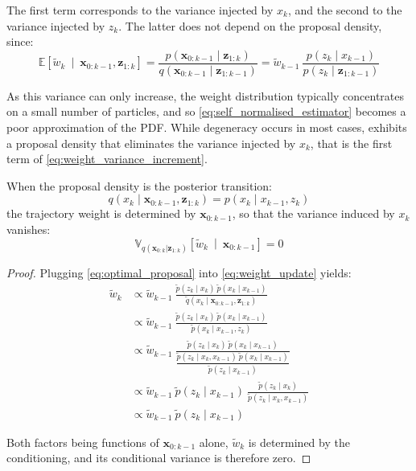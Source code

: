 The first term corresponds to the variance injected by $x_k$, and the second to the variance injected by $z_k$. The latter does not depend on the proposal density, since:
\begin{equation}
	\mathbb{E}\left[\tilde{w}_k\:\middle|\:\mathbf{x}_{0:k-1},\mathbf{z}_{1:k}\right]=\frac{p(\mathbf{x}_{0:k-1}\mid\mathbf{z}_{1:k})}{q(\mathbf{x}_{0:k-1}\mid\mathbf{z}_{1:k-1})}=\tilde{w}_{k-1}\:\frac{p(z_k\mid x_{k-1})}{p(z_k\mid\mathbf{z}_{1:k-1})}
\end{equation}

As this variance can only increase, the weight distribution typically concentrates on a small number of particles, and so \eqref{eq:self_normalised_estimator} becomes a poor approximation of the PDF. While degeneracy occurs in most cases,  exhibits a proposal density that eliminates the variance injected by $x_k$, that is the first term of \eqref{eq:weight_variance_increment}.

\begin{proposition}\label{th:optimal_proposal}
	When the proposal density is the posterior transition:
	\begin{equation}
		q(x_k\mid\mathbf{x}_{0:k-1},\mathbf{z}_{1:k})=p(x_k\mid x_{k-1},z_k)\label{eq:optimal_proposal}
	\end{equation}
	the trajectory weight is determined by $\mathbf{x}_{0:k-1}$, so that the variance induced by $x_k$ vanishes:
	\begin{equation}
		\mathbb{V}_{q(\mathbf{x}_{0:k}|\mathbf{z}_{1:k})}\left[\tilde{w}_k\:\middle|\:\mathbf{x}_{0:k-1}\right]=0
	\end{equation}
\end{proposition}

\begin{proof}
	Plugging \eqref{eq:optimal_proposal} into \eqref{eq:weight_update} yields:
	\begin{equation}
		\begin{aligned}
		\tilde{w}_k&\propto\tilde{w}_{k-1}\:\frac{\tilde{p}(z_k\mid x_k)\:\tilde{p}(x_k\mid x_{k-1})}{\tilde{q}(x_k\mid\mathbf{x}_{0:k-1},\mathbf{z}_{1:k})}\\
		&\propto\tilde{w}_{k-1}\:\frac{\tilde{p}(z_k\mid x_k)\:\tilde{p}(x_k\mid x_{k-1})}{\tilde{p}(x_k\mid x_{k-1},z_k)}\\
		&\propto\tilde{w}_{k-1}\:\frac{\tilde{p}(z_k\mid x_k)\:\tilde{p}(x_k\mid x_{k-1})}{\dfrac{\tilde{p}(z_k\mid x_k,x_{k-1})\:\tilde{p}(x_k\mid x_{k-1})}{\tilde{p}(z_k\mid x_{k-1})}}\\
		&\propto\tilde{w}_{k-1}\:\tilde{p}(z_k\mid x_{k-1})\:\frac{\tilde{p}(z_k\mid x_k)}{\tilde{p}(z_k\mid x_k,x_{k-1})}\\
		&\propto\tilde{w}_{k-1}\:\tilde{p}(z_k\mid x_{k-1})
		\end{aligned}
	\end{equation}

	Both factors being functions of $\mathbf{x}_{0:k-1}$ alone, $\tilde{w}_k$ is determined by the conditioning, and its conditional variance is therefore zero.
\end{proof}

